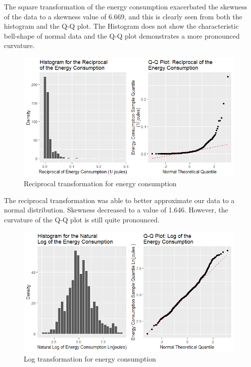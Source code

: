The square transformation of the energy consumption exacerbated the skewness of the data to a skewness value of 6.669, and this is clearly seen from both the histogram and the Q-Q plot.  The Histogram does not show the characteristic bell-shape of normal data and the Q-Q plot demonstrates a more pronounced curvature.


\begin{figure}[H]
  \includegraphics[width=\linewidth]{./NewImages/Fig_9_Reciprocal_Transform.png}
  \caption{Reciprocal transformation for energy consumption}
  \label{fig:histqq-rec}
\end{figure}

The reciprocal transformation was able to better approximate our data to a normal distribution. Skewness decreased to a value of 1.646. However, the curvature of the Q-Q plot is still quite pronounced.

\begin{figure}[H]
  \includegraphics[width=\linewidth]{./NewImages/Fig_10_Log_Transform.png}
  \caption{Log transformation for energy consumption}
  \label{fig:histqq-log}
\end{figure}


